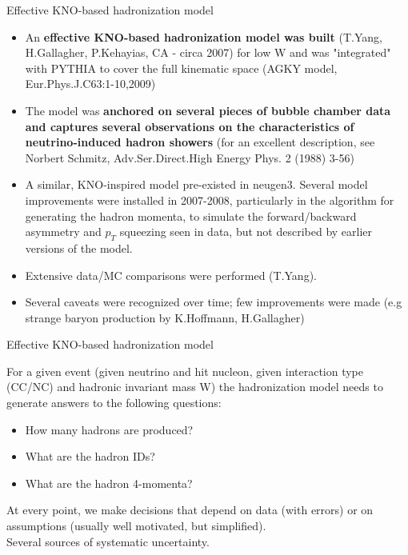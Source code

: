 \begin{frame}{Effective KNO-based hadronization model}

\begin{itemize}
 \item An {\bf effective KNO-based hadronization model was built} 
       (T.Yang, H.Gallagher, P.Kehayias, CA - circa 2007) for low W and was "integrated" with PYTHIA to cover the 
       full kinematic space (AGKY model, Eur.Phys.J.C63:1-10,2009)
 \item The model was {\bf anchored on several pieces of bubble chamber data and captures several observations 
       on the characteristics of neutrino-induced hadron showers} (for an excellent description, see Norbert Schmitz,
       Adv.Ser.Direct.High Energy Phys. 2 (1988) 3-56)
 \item A similar, KNO-inspired model pre-existed in neugen3. 
       Several model improvements were installed in 2007-2008, particularly in the algorithm for generating the hadron momenta,
       to simulate the forward/backward asymmetry and $p_{T}$ squeezing seen in data, but not described by earlier versions of the model.
 \item Extensive data/MC comparisons were performed (T.Yang).
 \item Several caveats were recognized over time; few improvements were made (e.g strange baryon production by K.Hoffmann, H.Gallagher)
\end{itemize}
\end{frame}



\begin{frame}{Effective KNO-based hadronization model}

For a given event (given neutrino and hit nucleon, given interaction type (CC/NC) and hadronic invariant mass W) 
the hadronization model needs to generate answers to the following questions:\\
\vspace{0.2cm}
\begin{itemize}
 \item How many hadrons are produced?
 \item What are the hadron IDs?
 \item What are the hadron 4-momenta?
\end{itemize}
\vspace{0.2cm}
At every point, we make decisions that depend on data (with errors) or on assumptions 
(usually well motivated, but simplified).\\
Several sources of systematic uncertainty.
\end{frame}




